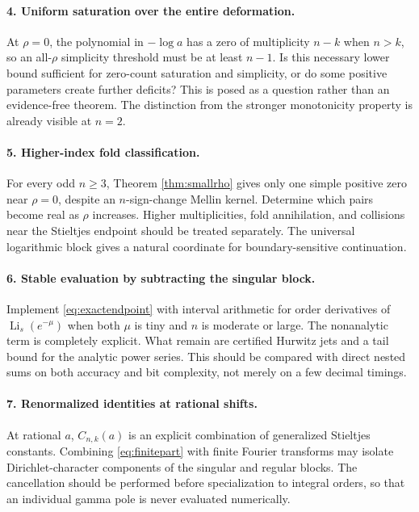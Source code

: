 \documentclass[11pt]{article}
\numberwithin{equation}{section}
\theoremstyle{definition}\newtheorem{definition}[theorem]{Definition}
\theoremstyle{remark}\newtheorem{remark}[theorem]{Remark}
\DeclareMathOperator{\Li}{Li}
\begin{document}
\paragraph{4. Uniform saturation over the entire deformation.}
At $\rho=0$, the polynomial in $-\log a$ has a zero of multiplicity $n-k$ when $n>k$, so an all-$\rho$ simplicity threshold must be at least $n-1$. Is this necessary lower bound sufficient for zero-count saturation and simplicity, or do some positive parameters create further deficits? This is posed as a question rather than an evidence-free theorem. The distinction from the stronger monotonicity property is already visible at $n=2$.

\paragraph{5. Higher-index fold classification.}
For every odd $n\geq3$, Theorem \ref{thm:smallrho} gives only one simple positive zero near $\rho=0$, despite an $n$-sign-change Mellin kernel. Determine which pairs become real as $\rho$ increases. Higher multiplicities, fold annihilation, and collisions near the Stieltjes endpoint should be treated separately. The universal logarithmic block gives a natural coordinate for boundary-sensitive continuation.

\paragraph{6. Stable evaluation by subtracting the singular block.}
Implement \eqref{eq:exactendpoint} with interval arithmetic for order derivatives of $\Li_s(e^{-\mu})$ when both $\mu$ is tiny and $n$ is moderate or large. The nonanalytic term is completely explicit. What remain are certified Hurwitz jets and a tail bound for the analytic power series. This should be compared with direct nested sums on both accuracy and bit complexity, not merely on a few decimal timings.

\paragraph{7. Renormalized identities at rational shifts.}
At rational $a$, $C_{n,k}(a)$ is an explicit combination of generalized Stieltjes constants. Combining \eqref{eq:finitepart} with finite Fourier transforms may isolate Dirichlet-character components of the singular and regular blocks. The cancellation should be performed before specialization to integral orders, so that an individual gamma pole is never evaluated numerically.
\end{document}
